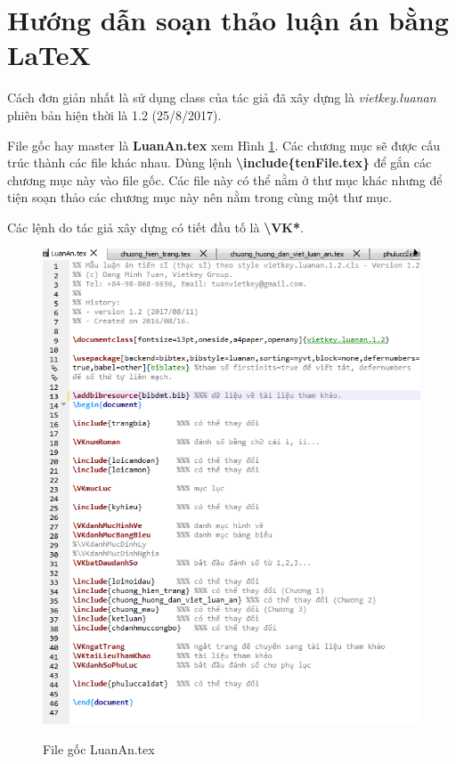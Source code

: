 \section{\bf Hướng dẫn soạn thảo luận án bằng \LaTeX} \label{mucchkydatp}

Cách đơn giản nhất là sử dụng class của tác giả đã xây dựng là \textit{vietkey.luanan} phiên bản hiện thời là 1.2 (25/8/2017).

File gốc hay master là \textbf{LuanAn.tex} xem Hình \ref{h.goc}. Các chương mục sẽ được cấu trúc thành các file khác nhau. 
Dùng lệnh \textbf{\textbackslash include\{tenFile.tex\}} để gắn các chương mục này vào file gốc. Các file này có thể nằm ở thư mục khác nhưng để tiện soạn thảo các chương mục này nên nằm trong cùng một thư mục.

Các lệnh do tác giả xây dựng có tiết đầu tố là \textbf{\textbackslash VK*}.

\begin{figure}[!ht]	
	\begin{center}		
		\includegraphics[scale=1.0]{master}
		\\		
	\end{center}	
	\caption{File gốc LuanAn.tex}	
	\label{h.goc}
\end{figure}

